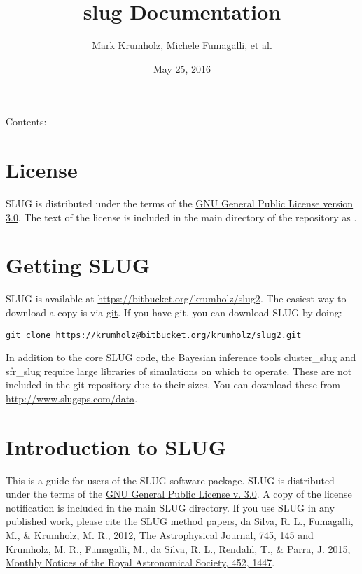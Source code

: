 \documentclass[letterpaper,10pt,english]{sphinxmanual}
\title{slug Documentation}
\date{May 25, 2016}
\author{Mark Krumholz, Michele Fumagalli, et al.}
\begin{document}
\maketitle
\tableofcontents
{}\label{index::doc}


Contents:


\chapter{License}
\label{license::doc}\label{license:welcome-to-slug-s-documentation}\label{license:license}
SLUG is distributed under the terms of the \href{http://www.gnu.org/copyleft/gpl.html}{GNU General Public License version 3.0}. The text of the license is included in the main directory of the repository as .


\chapter{Getting SLUG}
\label{getting:getting-slug}\label{getting::doc}
SLUG is available at \href{https://bitbucket.org/krumholz/slug2}{https://bitbucket.org/krumholz/slug2}. The easiest way to download a copy is via \href{http://git-scm.com/}{git}. If you have git, you can download SLUG by doing:

\begin{Verbatim}[commandchars=\\\{\}]
git clone https://krumholz@bitbucket.org/krumholz/slug2.git
\end{Verbatim}

In addition to the core SLUG code, the Bayesian inference tools cluster\_slug and sfr\_slug require large libraries of simulations on which to operate. These are not included in the git repository due to their sizes. You can download these from \href{http://www.slugsps.com/data}{http://www.slugsps.com/data}.


\chapter{Introduction to SLUG}
\label{intro:introduction-to-slug}\label{intro::doc}
This is a guide for users of the SLUG software package. SLUG is distributed under the terms of the \href{http://www.gnu.org/licenses/gpl.html}{GNU General Public License v. 3.0}. A copy of the license notification is included in the main SLUG directory. If you use SLUG in any published work, please cite the SLUG method papers, \href{http://adsabs.harvard.edu/abs/2012ApJ...745..145D}{da Silva, R. L., Fumagalli, M., \& Krumholz, M. R., 2012, The Astrophysical Journal, 745, 145} and \href{http://adsabs.harvard.edu/abs/2015MNRAS.452.1447K}{Krumholz, M. R., Fumagalli, M., da Silva, R. L., Rendahl, T., \& Parra, J. 2015, Monthly Notices of the Royal Astronomical Society, 452, 1447}.
\end{document}

